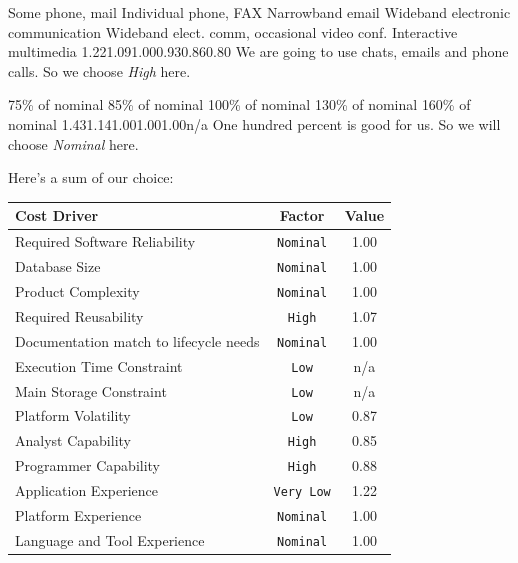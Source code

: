 \pagebreak
{}
{Some phone, mail}
{Individual phone, FAX}
{Narrowband email}
{Wideband electronic communication}
{Wideband elect. comm, occasional video conf.}
{Interactive multimedia}
{1.22}{1.09}{1.00}{0.93}{0.86}{0.80} { 
    We are going to use chats, emails and phone calls.
    So we choose \emph{High} here.
}

{75\% of nominal}
{85\% of nominal}
{100\% of nominal}
{130\% of nominal}
{160\% of nominal}
{}
{1.43}{1.14}{1.00}{1.00}{1.00}{n/a} { 
    One hundred percent is good for us. So we will choose \emph{Nominal} here.
}

\pagebreak

Here's a sum of our choice:

\begin{table}[h!]
    \centering
\begin{tabular}{| p{8cm} | c | c |} \hline
Cost Driver                               & Factor             &  Value   \\ \hline 
Required Software Reliability             & \texttt{Nominal}   &  1.00    \\
Database Size                             & \texttt{Nominal}   &  1.00    \\
Product Complexity                        & \texttt{Nominal}   &  1.00    \\
Required Reusability                      & \texttt{High}      &  1.07    \\
Documentation match to life\-cycle needs  & \texttt{Nominal}   &  1.00    \\
Execution Time Constraint                 & \texttt{Low}       &   n/a    \\
Main Storage Constraint                   & \texttt{Low}       &   n/a    \\
Platform Volatility                       & \texttt{Low}       &  0.87    \\
Analyst Capability                        & \texttt{High}      &  0.85    \\  
Programmer Capability                     & \texttt{High}      &  0.88    \\  
Application Experience                    & \texttt{Very Low}  &  1.22    \\  
Platform Experience                       & \texttt{Nominal}   &  1.00    \\  
Language and Tool Experience              & \texttt{Nominal}   &  1.00    \\  

\end{tabular}
\end{table}
